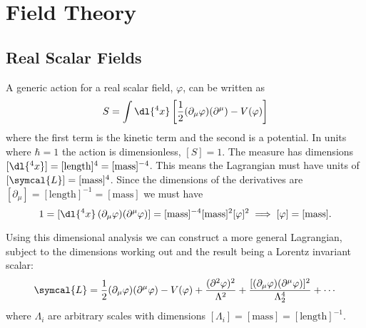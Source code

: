\documentclass[fleqn]{NotesClass}
\newcommand{\dalembertian}{\partial^2}
\newcommand{\lagrangianDensity}{\symcal{L}}
\begin{document}
    \chapter{Field Theory}
    \section{Real Scalar Fields}
    A generic action for a real scalar field, \(\varphi\), can be written as
    \begin{equation}
        S = \int \dl{^4x} \left[ \frac{1}{2} (\partial_\mu \varphi)(\partial^\mu) - V(\varphi) \right]
    \end{equation}
    where the first term is the kinetic term and the second is a potential.
    In units where \(\hbar = 1\) the action is dimensionless, \([S] = 1\).
    The measure has dimensions \([\dl{^4x}] = [\text{length}]^4 = [\text{mass}]^{-4}\).
    This means the Lagrangian must have units of \([\lagrangianDensity] = [\text{mass}]^4\).
    Since the dimensions of the derivatives are \([\partial_\mu] = [\text{length}]^{-1} = [\text{mass}]\) we must have
    \begin{equation}
        1 = [\dl{^4 x} \, (\partial_\mu \varphi) (\partial^\mu \varphi)] = [\text{mass}]^{-4} [\text{mass}]^2 [\varphi]^2 \implies [\varphi] = [\text{mass}].
    \end{equation}
    
    Using this dimensional analysis we can construct a more general Lagrangian, subject to the dimensions working out and the result being a Lorentz invariant scalar:
    \begin{equation}
        \lagrangianDensity = \frac{1}{2}(\partial_\mu \varphi)(\partial^\mu \varphi) - V(\varphi) +  \frac{(\dalembertian \varphi)^2}{\Lambda^2} +  \frac{[(\partial_\mu \varphi) (\partial^\mu \varphi)]^2}{\Lambda_2^4} + \dotsb
    \end{equation}
    where \(\Lambda_i\) are arbitrary scales with dimensions \([\Lambda_i] = [\text{mass}] = [\text{length}]^{-1}\).
    
\end{document}
